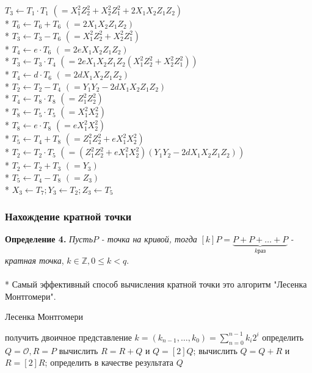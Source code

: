 \documentclass[12pt]{article}
\begin{document}
$T_3 \leftarrow T_1 \cdot T_1$ \hfill $(= X_1^2Z_2^2 + X_2^2Z_1^2 + 2X_1X_2Z_1Z_2)$ \\*
$T_6 \leftarrow T_6 + T_6$ \hfill $(= 2X_1X_2Z_1Z_2)$ \\*
$T_3 \leftarrow T_3 - T_6$ \hfill $(= X_1^2Z_2^2 + X_2^2Z_1^2)$ \\*
$T_4 \leftarrow e \cdot T_6$ \hfill $(= 2eX_1X_2Z_1Z_2)$ \\*
$T_3 \leftarrow T_3 \cdot T_4$ \hfill $(= 2eX_1X_2Z_1Z_2(X_1^2Z_2^2 + X_2^2Z_1^2))$ \\*
$T_4 \leftarrow d \cdot T_6$ \hfill $(= 2dX_1X_2Z_1Z_2)$ \\*
$T_2 \leftarrow T_2 - T_4$ \hfill $(= Y_1Y_2 - 2dX_1X_2Z_1Z_2)$ \\*
$T_4 \leftarrow T_8 \cdot T_8$ \hfill $(= Z_1^2Z_2^2)$ \\*
$T_8 \leftarrow T_5 \cdot T_5$ \hfill $(= X_1^2X_2^2)$ \\*
$T_8 \leftarrow e \cdot T_8$ \hfill $(= eX_1^2X_2^2)$ \\*
$T_5 \leftarrow T_4 + T_8$ \hfill $(= Z_1^2Z_2^2 + eX_1^2X_2^2)$ \\*
$T_2 \leftarrow T_2 \cdot T_5$ \hfill $(= (Z_1^2Z_2^2 + eX_1^2X_2^2)(Y_1Y_2 - 2dX_1X_2Z_1Z_2))$ \\*
$T_2 \leftarrow T_2 + T_3$ \hfill $(= Y_3)$ \\*
$T_5 \leftarrow T_4 - T_8$ \hfill $(= Z_3)$ \\*
$X_3 \leftarrow T_7; Y_3 \leftarrow T_2; Z_3 \leftarrow T_5$

\subsubsection{Нахождение кратной точки}
\textbf{Определение 4.} \textit{Пусть}$P$\textit{ - точка на кривой, тогда} $[k]P = \underbrace{P + P + \dots + P}_{k раз}$ \textit{- кратная точка}, $k \in \mathbb{Z}, 0 \le k < q$. \\
\\*
Самый эффективный способ вычисления кратной точки это алгоритм "Лесенка Монтгомери".
\begin{algorithm}
\caption{Лесенка Монтгомери}
\begin{algorithmic}[1]
\STATE получить двоичное представление $k = (k_{n - 1}, \dots, k_0) = \sum^{n - 1}_{n = 0}k_i2^i$
\STATE определить $Q = \mathcal{O}, R = P$
		\STATE вычислить $R = R + Q$ и $Q = [2]Q$;
	\ENDIF
		\STATE вычислить $Q = Q + R$ и $R = [2]R$;
	\ENDIF
\ENDFOR
\STATE определить в качестве результата $Q$
\end{algorithmic}
\end{algorithm}
\newpage
\end{document}
